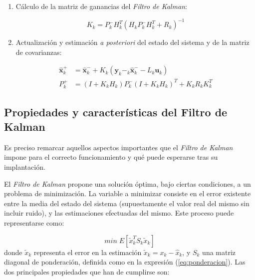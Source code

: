 \begin{enumerate}
\item Cálculo de la matriz de ganancias del \emph{Filtro de Kalman}:

\begin{equation}
	K_k = P_k^{-}H_k^T(H_kP_k^{-}H_k^T + R_k)^{-1}
\end{equation}

\item Actualización y estimación \emph{a posteriori} del estado del sistema y de la matriz de covarianzas:

\begin{equation}
\begin{split}
	\boldsymbol{\hat{x}}_k^{+} &= \boldsymbol{\hat{x}}_k^{-} + K_k(\boldsymbol{y}_k - _k\boldsymbol{\hat{x}}_k^{-} - L_k\boldsymbol{u}_k) \\
	P_k^{+} &= (I + K_kH_k)P_k^{-}(I + K_kH_k)^T + K_kR_kK_k^T
\end{split}
\end{equation}

\end{enumerate}

\subsection[Propiedades y características]{Propiedades y características del Filtro de Kalman}

Es preciso remarcar aquellos aspectos importantes que el \emph{Filtro de Kalman} impone para el correcto funcionamiento y qué puede esperarse tras su implantación. \par 

El \emph{Filtro de Kalman} propone una solución óptima, bajo ciertas condiciones, a un problema de minimización. La variable a minimizar consiste en el error existente entre la media del estado del sistema (supuestamente el valor real del mismo sin incluir ruido), y las estimaciones efectuadas del mismo. Este proceso puede representarse como:

\[ min \; E[\tilde{x}_k^T S_k \tilde{x}_k] \]
\noindent
donde $\tilde{x}_k$ representa el error en la estimación $\tilde{x}_k = x_k - \hat{x}_k$, y $S_k$ una matriz diagonal de ponderación, definida como en la expresión (\ref{eq:ponderacion}). Las dos principales propiedades que han de cumplirse son: \par 

